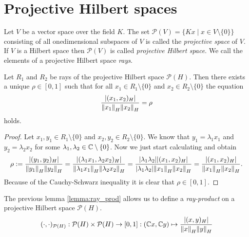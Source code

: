\section{Projective Hilbert spaces}

\begin{definition}
	Let $V$ be a vector space over the field $K$. The set $\mathcal{P}(V) = \{Kx \mid x \in V \setminus \{0\}\}$ consisting of all onedimensional subspaces of $V$ is called the \textit{projective space} of $V$. If $V$ is a Hilbert space then $\mathcal{P}(V)$ is called \textit{projective Hilbert space}. We call the elements of a projective Hilbert space \textit{rays}.
\end{definition}


\begin{lemma} \label{lemma:ray_prod}
	Let $R_1$ and $R_2$ be rays of the projective Hilbert space $\mathcal{P}(H)$. Then there exists a unique $\rho \in [0, 1]$ such that for all $x_1 \in R_1 \setminus \{0\}$ and $x_2 \in R_2 \setminus \{0\}$ the equation
	\begin{align*}
		\frac{\vbraces{(x_1, x_2)_H}}{\norm[H]{x_1} \norm[H]{x_2}} = \rho
	\end{align*}
	holds.
\end{lemma}

\begin{proof}
	Let $x_1, y_1 \in R_1 \setminus \{0\}$ and $x_2, y_2 \in R_2 \setminus \{0\}$. We know that $y_1 = \lambda_1 x_1$ and $y_2 = \lambda_2 x_2$ for some $\lambda_1, \lambda_2 \in \C \setminus \{0\}$. Now we just start calculating and obtain
	\begin{align*}
		\rho := \frac{\vbraces{(y_1, y_2)_H}}{\norm[H]{y_1} \norm[H]{y_2}} = \frac{\vbraces{(\lambda_1 x_1, \lambda_2 x_2)_H}}{\norm[H]{\lambda_1 x_1} \norm[H]{\lambda_2 x_2}} = \frac{\vbraces{\lambda_1 \lambda_2}\vbraces{(x_1, x_2)_H}}{\vbraces{\lambda_1 \lambda_2}\norm[H]{x_1} \norm[H]{x_2}} = \frac{\vbraces{(x_1, x_2)_H}}{\norm[H]{x_1} \norm[H]{x_2}}.
	\end{align*}
	Because of the Cauchy-Schwarz inequality it is clear that $\rho \in [0,1]$. 
\end{proof}


\begin{definition}
	The previous lemma \ref{lemma:ray_prod} allows us to define a \textit{ray-product} on a projective Hilbert space $\mathcal{P}(H)$.
	\begin{align*}
		(\cdot, \cdot)_{\mathcal{P}(H)}: \mathcal{P}(H) \times \mathcal{P}(H) \to [0,1] : (\C x, \C y) \mapsto \frac{\vbraces{(x, y)_H}}{\norm[H]{x} \norm[H]{y}}
	\end{align*}
\end{definition}


